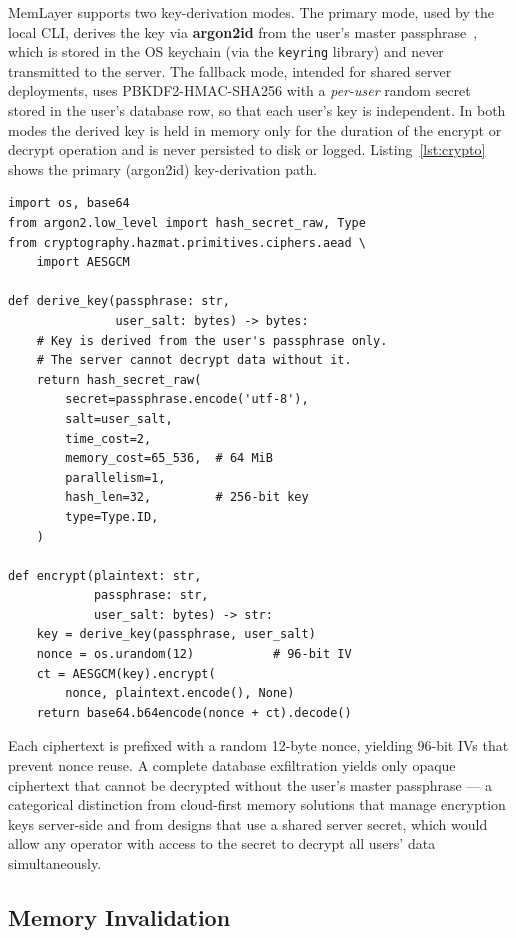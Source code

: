\documentclass[10pt,twocolumn]{article}
\begin{document}
MemLayer supports two key-derivation modes.  The primary mode, used by the
local CLI, derives the key via \textbf{argon2id} from the user's master
passphrase~\citep{biryukov2016argon2}, which is stored in the OS keychain
(via the \texttt{keyring} library) and never transmitted to the server.
The fallback mode, intended for shared server deployments, uses
PBKDF2-HMAC-SHA256 with a \emph{per-user} random secret stored in the
user's database row, so that each user's key is independent.  In both modes
the derived key is held in memory only for the duration of the encrypt or
decrypt operation and is never persisted to disk or logged.
Listing~\ref{lst:crypto} shows the primary (argon2id) key-derivation path.

\begin{lstlisting}[caption={Per-user AES-256-GCM key derivation via argon2id. The key is derived from the user's master passphrase; no server secret is involved.},label=lst:crypto]
import os, base64
from argon2.low_level import hash_secret_raw, Type
from cryptography.hazmat.primitives.ciphers.aead \
    import AESGCM

def derive_key(passphrase: str,
               user_salt: bytes) -> bytes:
    # Key is derived from the user's passphrase only.
    # The server cannot decrypt data without it.
    return hash_secret_raw(
        secret=passphrase.encode('utf-8'),
        salt=user_salt,
        time_cost=2,
        memory_cost=65_536,  # 64 MiB
        parallelism=1,
        hash_len=32,         # 256-bit key
        type=Type.ID,
    )

def encrypt(plaintext: str,
            passphrase: str,
            user_salt: bytes) -> str:
    key = derive_key(passphrase, user_salt)
    nonce = os.urandom(12)           # 96-bit IV
    ct = AESGCM(key).encrypt(
        nonce, plaintext.encode(), None)
    return base64.b64encode(nonce + ct).decode()
\end{lstlisting}

Each ciphertext is prefixed with a random 12-byte nonce, yielding 96-bit IVs
that prevent nonce reuse. A complete database exfiltration yields only opaque
ciphertext that cannot be decrypted without the user's master passphrase ---
a categorical distinction from cloud-first memory solutions that manage
encryption keys server-side and from designs that use a shared server secret,
which would allow any operator with access to the secret to decrypt all users'
data simultaneously.

\subsection{Memory Invalidation}
\label{sec:invalidation}
\end{document}
